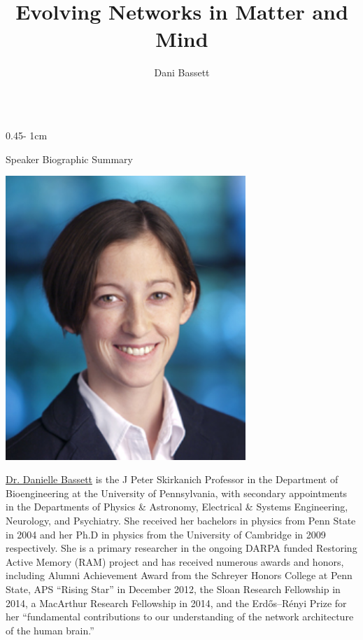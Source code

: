 \documentclass{../psuposter}
\title{Evolving Networks in Matter and Mind}
\author{Dani Bassett}
\institute{University of Pennsylvania}
\begin{document}
\begin{frame}
\begin{columns}[t, totalwidth=\textwidth]
\begin{column}{0.45\textwidth - 1cm}


    \begin{block}{Speaker Biographic Summary}
    	\begin{center}
    		\includegraphics[width=0.68\textwidth]{images/portrait}
    	\end{center}
    	\href{https://complexsystemsupenn.com/personal}{Dr. Danielle Bassett} is the J Peter Skirkanich Professor in the Department of Bioengineering at the University of Pennsylvania, with secondary appointments in the Departments of Physics \& Astronomy, Electrical \& Systems Engineering, Neurology, and Psychiatry. She received her bachelors in physics from Penn State in 2004 and her Ph.D in physics from the University of Cambridge in 2009 respectively. She is a primary researcher in the ongoing DARPA funded Restoring Active Memory (RAM) project and has received numerous awards and honors, including  Alumni Achievement Award from the Schreyer Honors College at Penn State, APS “Rising Star” in December 2012, the Sloan Research Fellowship in 2014, a MacArthur Research Fellowship in 2014, and the Erdős–Rényi Prize for her ``fundamental contributions to our understanding of the network architecture of the human brain.''
    \end{block}



\end{column}
\end{columns}
\end{frame}
\end{document}
